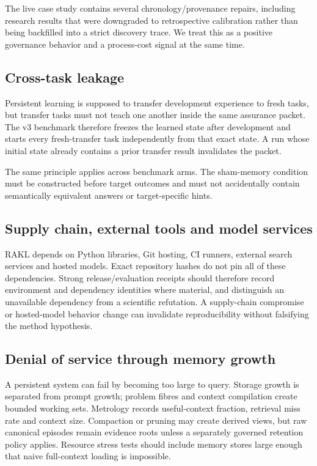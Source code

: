 The live case study contains several chronology/provenance repairs, including research results that were downgraded to retrospective calibration rather than being backfilled into a strict discovery trace. We treat this as a positive governance behavior and a process-cost signal at the same time.

\subsection{Cross-task leakage}

Persistent learning is supposed to transfer development experience to fresh tasks, but transfer tasks must not teach one another inside the same assurance packet. The v3 benchmark therefore freezes the learned state after development and starts every fresh-transfer task independently from that exact state. A run whose initial state already contains a prior transfer result invalidates the packet.

The same principle applies across benchmark arms. The sham-memory condition must be constructed before target outcomes and must not accidentally contain semantically equivalent answers or target-specific hints.

\subsection{Supply chain, external tools and model services}

RAKL depends on Python libraries, Git hosting, CI runners, external search services and hosted models. Exact repository hashes do not pin all of these dependencies. Strong release/evaluation receipts should therefore record environment and dependency identities where material, and distinguish an unavailable dependency from a scientific refutation. A supply-chain compromise or hosted-model behavior change can invalidate reproducibility without falsifying the method hypothesis.

\subsection{Denial of service through memory growth}

A persistent system can fail by becoming too large to query. Storage growth is separated from prompt growth; problem fibres and context compilation create bounded working sets. Metrology records useful-context fraction, retrieval miss rate and context size. Compaction or pruning may create derived views, but raw canonical episodes remain evidence roots unless a separately governed retention policy applies. Resource stress tests should include memory stores large enough that naive full-context loading is impossible.

